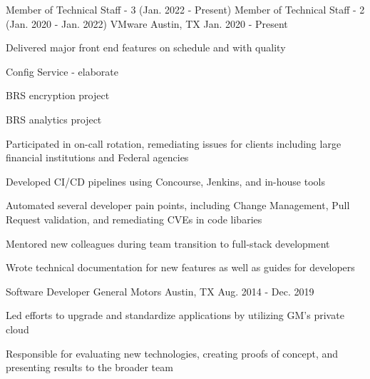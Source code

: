

\begin{cventries}

  \cventryroles
    {Member of Technical Staff - 3 (Jan. 2022 - Present)}
    {Member of Technical Staff - 2 (Jan. 2020 - Jan. 2022)}
    {VMware} %
    {Austin, TX} %
    {Jan. 2020 - Present}
    {
      \begin{cvitems} %
        \item {Delivered major front end features on schedule and with quality}
        \item {Config Service - elaborate}
        \item {BRS encryption project}
        \item {BRS analytics project}
        \item {Participated in on-call rotation, remediating issues for clients including large financial institutions and Federal agencies}
        \item {Developed CI/CD pipelines using Concourse, Jenkins, and in-house tools}
        \item {Automated several developer pain points, including Change Management, Pull Request validation, and remediating CVEs in code libaries}
        \item {Mentored new colleagues during team transition to full-stack development}
        \item {Wrote technical documentation for new features as well as guides for developers}
      \end{cvitems}
    }
  \cventry
    {Software Developer} %
    {General Motors} %
    {Austin, TX} %
    {Aug. 2014 - Dec. 2019} %
    {
      \begin{cvitems} %
        \item {Led efforts to upgrade and standardize applications by utilizing GM's private cloud}
         \item {Responsible for evaluating new technologies, creating proofs of concept, and presenting results to the broader team} 

\end{cvitems}}
\end{cventries}
